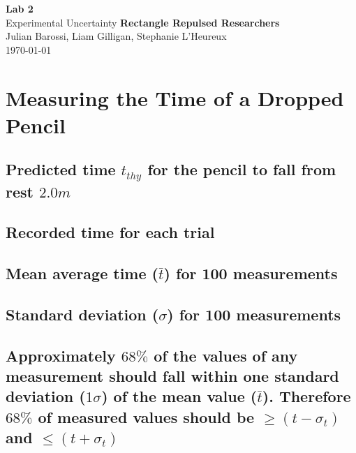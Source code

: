 \documentclass[11pt, letterpaper, includehead]{article}
\begin{document}
  \begin{titlepage} 
    \begin{center}
      \Huge{\textbf{Lab 2}}\\
      \Huge{Experimental Uncertainty}
      \vfill
      \large{\textbf{Rectangle Repulsed Researchers}}\\
      \large{Julian Barossi, Liam Gilligan, Stephanie L'Heureux}\\
      \vspace{0.5cm}
      \normalsize
      \today
    \end{center}
  \end{titlepage}

  \tableofcontents
  \pagebreak %


  \pagestyle{fancy}
  \fancyhead{}

  \section{Measuring the Time of a Dropped Pencil} %
  
  \subsection{Predicted time $t_{thy}$ for the pencil to fall from rest $2.0m$} %
  
  \subsection{Recorded time for each trial} %

  \setcounter{subsection}{3} %
  \subsection{Mean average time ($\bar{t}$) for 100 measurements} %

  \subsection{Standard deviation ($\sigma$) for 100 measurements} %

  \subsection{Approximately $68\%$ of the values of any measurement should fall within one 
  standard deviation ($1 \sigma$) of the mean value ($\bar{t}$). Therefore $68\%$ of measured 
  values should be $\geq (t - \sigma_t)$ and $\leq (t + \sigma_t)$} %
\end{document}
